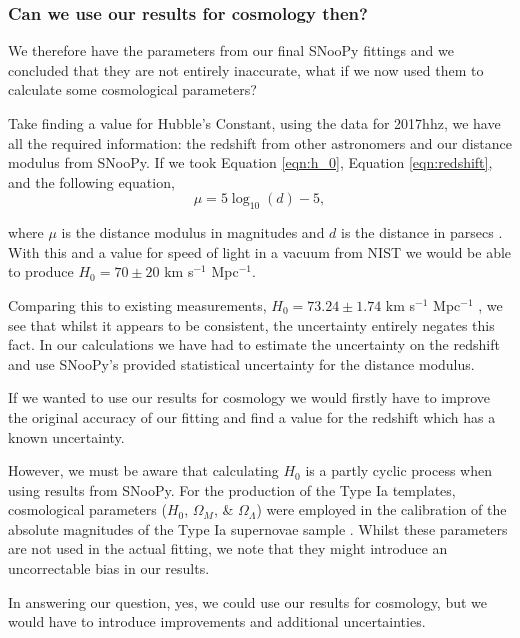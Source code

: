 \documentclass[twocolumn]{revtex4}
\begin{document}
\vspace{-4ex}
\subsubsection{Can we use our results for cosmology then?}
\vspace{-2ex}

We therefore have the parameters from our final SNooPy fittings and we concluded that they are not entirely inaccurate, what if we now used them to calculate some cosmological parameters?

Take finding a value for Hubble's Constant, using the data for 2017hhz, we have all the required information: the redshift from other astronomers and our distance modulus from SNooPy. If we took Equation \ref{eqn:h_0}, Equation \ref{eqn:redshift}, and the following equation, 
\begin{equation}
\mu = 5 \log_{10}(d) - 5,
\end{equation}

where $\mu$ is the distance modulus in magnitudes and $d$ is the distance in parsecs \cite{mod_ast}. With this and a value for speed of light in a vacuum from NIST \cite{speed_of_light} we would be able to produce $H_0=70\pm20$ km s$^{-1}$ Mpc$^{-1}$.

Comparing this to existing measurements, $H_0 = 73.24 \pm 1.74$ km s$^{-1}$ Mpc$^{-1}$ \cite{hubble_constant}, we see that whilst it appears to be consistent, the uncertainty entirely negates this fact. In our calculations we have had to estimate the uncertainty on the redshift and use SNooPy's provided statistical uncertainty for the distance modulus.

If we wanted to use our results for cosmology we would firstly have to improve the original accuracy of our fitting and find a value for the redshift which has a known uncertainty.  
 
However, we must be aware that calculating $H_0$ is a partly cyclic process when using results from SNooPy. For the production of the Type Ia templates, cosmological parameters ($H_0$, $\Omega_M$, \& $\Omega_{\Lambda}$) were employed in the calibration of the absolute magnitudes of the Type Ia supernovae sample \cite{car_snoopy}. Whilst these parameters are not used in the actual fitting, we note that they might introduce an uncorrectable bias in our results. 

In answering our question, yes, we could use our results for cosmology, but we would have to introduce improvements and additional uncertainties. 
\end{document}
